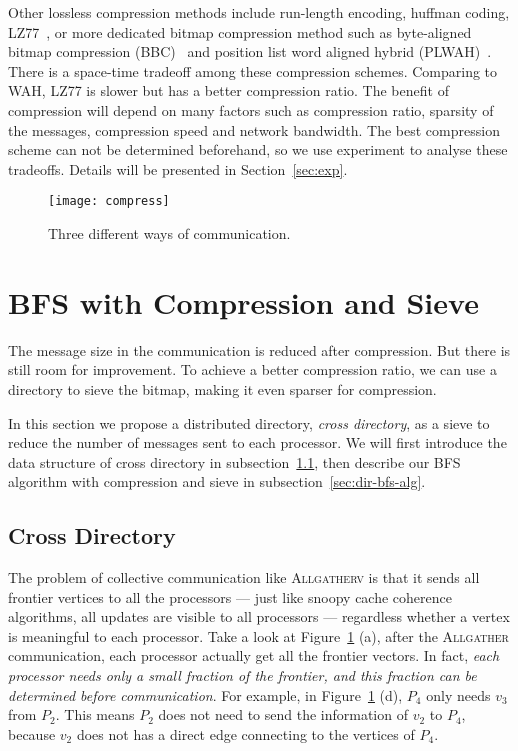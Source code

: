 \documentclass[conference]{IEEEtran}
\begin{document}
Other lossless compression methods include run-length encoding, huffman
coding, LZ77~\cite{lz77}, or more dedicated bitmap compression method such as
byte-aligned bitmap compression (BBC)~\cite{Antoshenkov:1995:BBC} and position
list word aligned hybrid (PLWAH)~\cite{Deliege:2010:PLWAH}. There is a
space-time tradeoff among these compression schemes. Comparing to WAH, LZ77 is
slower but has a better compression ratio. The benefit of compression will
depend on many factors such as compression ratio, sparsity of the messages,
compression speed and network bandwidth. The best compression scheme can not
be determined beforehand, so we use experiment to analyse these
tradeoffs. Details will be presented in Section~\ref{sec:exp}.


\begin{figure}[t]
  \centering
  \texttt{[image: compress]}
  \caption{Three different ways of communication.}
  \label{fig:compress}
\end{figure}

\section{BFS with Compression and Sieve}
\label{sec:dir-bfs}

The message size in the communication is reduced after compression. But there
is still room for improvement. To achieve a better compression ratio, we can
use a directory to sieve the bitmap, making it even sparser for compression.

In this section we propose a distributed directory, \textit{cross directory},
as a sieve to reduce the number of messages sent to each processor. We will
first introduce the data structure of cross directory in
subsection~\ref{sec:cross-dir}, then describe our BFS algorithm with
compression and sieve in subsection~\ref{sec:dir-bfs-alg}.

\subsection{Cross Directory}
\label{sec:cross-dir}

The problem of collective communication like \textsc{Allgatherv} is that it
sends all frontier vertices to all the processors --- just like snoopy cache
coherence algorithms, all updates are visible to all processors --- regardless
whether a vertex is meaningful to each processor. Take a look at
Figure~\ref{fig:compress} (a), after the \textsc{Allgather} communication,
each processor actually get all the frontier vectors. In fact, \emph{each
  processor needs only a small fraction of the frontier, and this fraction can
  be determined before communication}. For example, in
Figure~\ref{fig:compress} (d), $P_4$ only needs $v_3$ from $P_2$. This means
$P_2$ does not need to send the information of $v_2$ to $P_4$, because $v_2$
does not has a direct edge connecting to the vertices of $P_4$.
\end{document}
